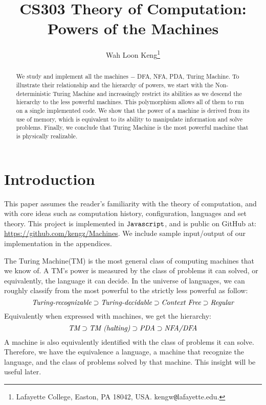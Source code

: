 \documentclass[12pt]{article}  %
\begin{document}
\title{CS303 Theory of Computation:\\ Powers of the Machines}

\author{
{Wah Loon Keng}\thanks{
Lafayette College,
Easton, PA 18042, USA.
kengw{\tt @}lafayette.edu.}
}
\maketitle

\begin{abstract}
We study and implement all the machines $-$ DFA, NFA, PDA, Turing Machine. To illustrate their relationship and the hierarchy of powers, we start with the Non-deterministic Turing Machine and increasingly restrict its abilities as we descend the hierarchy to the less powerful machines. This polymorphism allows all of them to run on a single implemented code. We show that the power of a machine is derived from its use of memory, which is equivalent to its ability to manipulate information and solve problems. Finally, we conclude that Turing Machine is the most powerful machine that is physically realizable.
\end{abstract}







\section{Introduction} \label{intro}


This paper assumes the reader's familiarity with the theory of computation, and with core ideas such as computation history, configuration, languages and set theory. This project is implemented in ${\tt Javascript}$, and is public on GitHub at: \url{https://github.com/kengz/Machines}. We include sample input/output of our implementation in the appendices.

The Turing Machine(TM) is the most general class of computing machines that we know of. A TM's power is measured by the class of problems it can solved, or equivalently, the language it can decide. In the universe of languages, we can roughly classify from the most powerful to the strictly less powerful as follow:
$$\emph{Turing-recognizable} \supset \emph{Turing-decidable} \supset \emph{Context Free} \supset \emph{Regular}$$
Equivalently when expressed with machines, we get the hierarchy:
$$\emph{TM} \supset \emph{TM (halting)} \supset \emph{PDA} \supset \emph{NFA/DFA}$$
A machine is also equivalently identified with the class of problems it can solve. Therefore, we have the equivalence a language, a machine that recognize the language, and the class of problems solved by that machine. This insight will be useful later.
\end{document}
